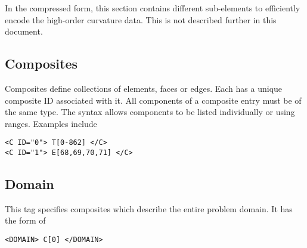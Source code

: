 \begin{notebox}
    In the compressed form, this section contains different sub-elements to
    efficiently encode the high-order curvature data. This is not described
    further in this document.
\end{notebox}

\subsection{Composites}
Composites define collections of elements, faces or edges. Each has a unique composite ID associated with it. All components of a composite entry must be of the same type. The syntax allows components to be listed individually or using ranges. Examples include
\begin{lstlisting}[style=XMLStyle]
<C ID="0"> T[0-862] </C>
<C ID="1"> E[68,69,70,71] </C>
\end{lstlisting}


\subsection{Domain}
This tag specifies composites which describe the entire problem domain. It has the form of
\begin{lstlisting}[style=XMLStyle]
<DOMAIN> C[0] </DOMAIN>
\end{lstlisting}
